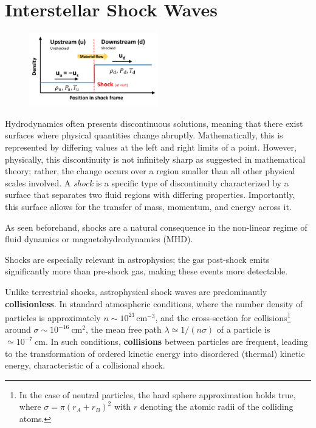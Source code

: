 \section{Interstellar Shock Waves}

\begin{figure}[!t]
\centering
\includegraphics[width=0.5\textwidth]{figures/downupstream.pdf}
\caption{}
\end{figure}

Hydrodynamics often presents discontinuous solutions, meaning that there exist surfaces where physical quantities change abruptly. Mathematically, this is represented by differing values at the left and right limits of a point. However, physically, this discontinuity is not infinitely sharp as suggested in mathematical theory; rather, the change occurs over a region smaller than all other physical scales involved. 
%
A \emph{shock} is a specific type of discontinuity characterized by a surface that separates two fluid regions with differing properties. Importantly, this surface allows for the transfer of mass, momentum, and energy across it.

As seen beforehand, shocks are a natural consequence in the non-linear regime of fluid dynamics or magnetohydrodynamics (MHD).

Shocks are especially relevant in astrophysics; the gas post-shock emits significantly more than pre-shock gas, making these events more detectable.

Unlike terrestrial shocks, astrophysical shock waves are predominantly \textbf{collisionless}. 
%
In standard atmospheric conditions, where the number density of particles is approximately \( n \sim 10^{23} \, \text{cm}^{-3} \), and the cross-section for collisions\footnote{In the case of neutral particles, the hard sphere approximation holds true, where \( \sigma = \pi (r_A + r_B)^2 \) with \( r \) denoting the atomic radii of the colliding atoms.} around \( \sigma \sim 10^{-16}~\text{cm}^2 \), the mean free path \( \lambda \simeq 1 / (n \sigma) \) of a particle is \( \simeq 10^{-7}~\text{cm} \). 
%
In such conditions, \textbf{collisions} between particles are frequent, leading to the transformation of ordered kinetic energy into disordered (thermal) kinetic energy, characteristic of a collisional shock.


